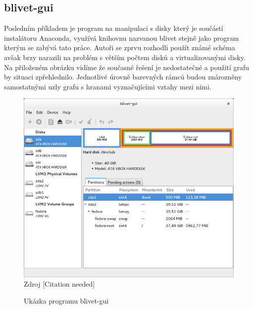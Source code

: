 \documentclass[a4paper]{article}
\begin{document}
\subsection{blivet-gui}

Posledním příkladem je program na manipulaci s disky který je součástí instalátoru Anaconda, využívá knihovnu nazvanou blivet stejně jako program kterým se zabývá tato práce. Autoři se zprvu 
rozhodli použít známé schéma avšak brzy narazili na problém s větším počtem disků a virtualizovanými disky. Na přiloženém obrázku vidíme že současné řešení je nedostatečné a použití grafu by
situaci zpřehlednilo. Jednotlivé úrovně barevných rámců budou znározněny samostatnými uzly grafu s hranami vyznačujícími vztahy mezi nimi. 

\begin{figure}
\label{fig:blivet}
\caption{Ukázka programu blivet-gui}
\centering
\includegraphics[width=.8\columnwidth]{pics/blivet-gui-1.png}\\
\scriptsize Zdroj [Citation needed]
\end{figure}
\end{document}
